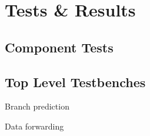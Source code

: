 \chapter{Tests \& Results}

\section{Component Tests}

\section{Top Level Testbenches}

Branch prediction

Data forwarding
